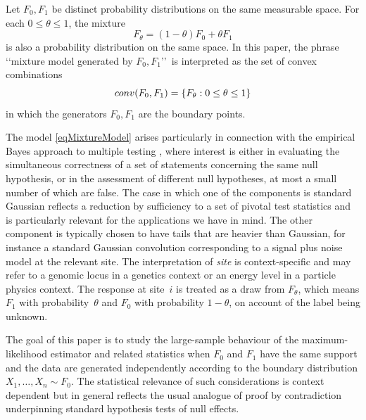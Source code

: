 \documentclass[11pt]{article}
\theoremstyle{definition}
\def\conv{\mathop{\rm conv}\nolimits}
\begin{document}
Let $F_0, F_1$ be distinct probability distributions on the same measurable space.
For each $0 \le\theta \le 1$, the mixture
%
\begin{equation}\label{eqMixtureModel}
	F_\theta = (1 - \theta) F_0 + \theta F_1
\end{equation}
%
is also a probability distribution on the same space.
In this paper, the phrase \lq\lq mixture model generated by $F_0, F_1$\rq\rq\ is interpreted as the set of convex combinations
\[
\conv(F_0, F_1) = \{ F_\theta : 0 \le \theta \le 1\}
\]
%
in which the generators $F_0, F_1$ are the boundary points.

The model \eqref{eqMixtureModel} arises particularly in connection with the empirical Bayes approach to multiple testing \citep{Efron2001}, 
where interest is either in evaluating the simultaneous correctness of a set of statements concerning the same null hypothesis, or in the assessment of different null hypotheses, at most a small number of which are false. The case in which one of the components is standard Gaussian reflects a reduction by sufficiency to a set of pivotal test statistics and is particularly relevant for the applications we have in mind. The other component is typically chosen to have tails that are heavier than Gaussian, for instance a standard Gaussian convolution corresponding to a signal plus noise model at the relevant site.  The interpretation of \emph{site} is context-specific and may refer to a genomic locus in a genetics context or an energy level in a particle physics context. The response at site~$i$ is treated as a draw from $F_\theta$, which means $F_1$ with probability~$\theta$ and $F_0$ with probability $1-\theta$, on account of the label being unknown.



The goal of this paper is to study the large-sample behaviour of the maximum-likelihood estimator and related statistics
when $F_0$ and $F_1$ have the same support and the data are generated independently according to the boundary distribution $X_{1},\ldots,X_n\sim F_0$. The statistical relevance of such considerations is context dependent but in general reflects the usual analogue of proof by contradiction underpinning standard hypothesis tests of null effects.
\end{document}
